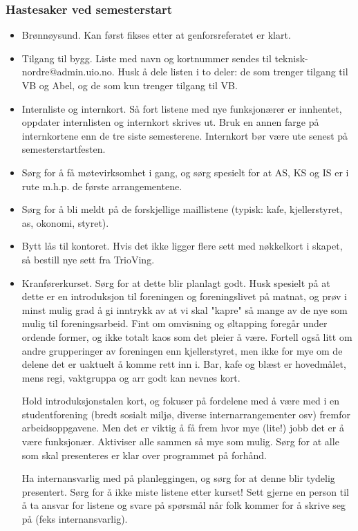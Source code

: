 \subsubsection{Hastesaker ved semesterstart}
\begin{itemize}
\item Brønnøysund. Kan først fikses etter at genforsreferatet er klart.
\item Tilgang til bygg. Liste med navn og kortnummer sendes
      til teknisk-nordre@admin.uio.no. Husk å dele listen i
      to deler: de som trenger tilgang til VB og Abel, og de
      som kun trenger tilgang til VB.
\item Internliste og internkort. Så fort listene med nye funksjonærer er innhentet,
	oppdater internlisten og internkort skrives ut. Bruk en annen farge på internkortene
	enn de tre siste semesterene. Internkort bør være ute senest på semesterstartfesten.
\item Sørg for å få møtevirksomhet i gang, og sørg spesielt for at AS, KS og IS er i rute m.h.p.
	de første arrangementene.
\item Sørg for å bli meldt på de forskjellige maillistene (typisk: kafe, kjellerstyret, as, okonomi, styret).
\item Bytt lås til kontoret. Hvis det ikke ligger flere sett med nøkkelkort i skapet, så bestill nye sett fra TrioVing.
\item Kranførerkurset. Sørg for at dette blir planlagt godt. Husk spesielt på at dette er en introduksjon til foreningen
	og foreningslivet på matnat, og prøv i minst mulig grad å gi inntrykk av at vi skal "kapre" så mange av de nye
	som mulig til foreningsarbeid. Fint om omvisning og øltapping foregår under ordende former, og ikke totalt
	kaos som det pleier å være. Fortell også litt om andre grupperinger av foreningen enn kjellerstyret,
	men ikke for mye om de delene det er uaktuelt å komme rett inn i. Bar, kafe og blæst er hovedmålet,
	mens regi, vaktgruppa og arr godt kan nevnes kort.

	Hold introduksjonstalen kort, og fokuser på fordelene med å være med i en studentforening
	(bredt sosialt miljø, diverse internarrangementer osv) fremfor arbeidsoppgavene.
	Men det er viktig å få frem hvor mye (lite!) jobb det er å være funksjonær.
	Aktiviser alle sammen så mye som mulig. Sørg for at alle som skal presenteres er klar
	over programmet på forhånd.

    Ha internansvarlig med på planleggingen, og sørg for at denne blir tydelig presentert.
    Sørg for å ikke miste listene etter kurset! Sett gjerne en person til å ta
    ansvar for listene og svare på spørsmål når folk kommer for å skrive seg på (feks internansvarlig).
\end{itemize}


